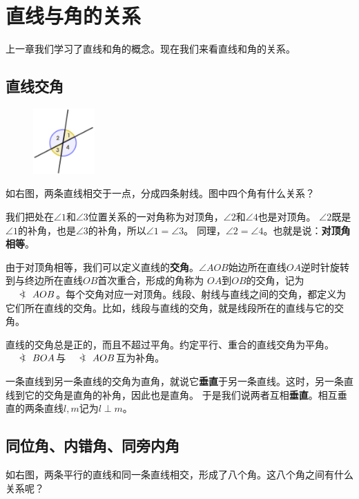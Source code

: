\documentclass[12pt,UTF8]{ctexbook}
\newcommand{\arcangle}{\mathord{\mathpalette\doarcangle\relax}}
\newcommand{\doarcangle}[2]{%
  \hbox{%
    \sbox0{$#1B$}%
    \sbox2{$#1<$}%
    \raisebox{\dimexpr\dp0+(\ht0-\ht2)/2}{%
      $#1<\mspace{-9mu}\mathrel{)}\mspace{2mu}$%
    }%
  }%
}
\begin{document}
\chapter{直线与角的关系}
上一章我们学习了直线和角的概念。现在我们来看直线和角的关系。

\section{直线交角}
\begin{figure} %
    \vspace{-10pt}
    \includegraphics[width=0.21\textwidth]{角度0.png}
\end{figure}

如右图，两条直线相交于一点，分成四条射线。图中四个角有什么关系？

我们把处在$\angle 1$和$\angle 3$位置关系的一对角称为对顶角，$\angle 2$和$\angle 4$也是对顶角。
$\angle 2$既是$\angle 1$的补角，也是$\angle 3$的补角，所以$\angle 1 = \angle 3$。
同理，$\angle 2 = \angle 4$。也就是说：\textbf{对顶角相等}。

由于对顶角相等，我们可以定义直线的\textbf{交角}。$\angle AOB$始边所在直线$OA$逆时针旋转到与终边所在直线$OB$首次重合，形成的角称为
$OA$到$OB$的交角，记为$\arcangle AOB$。每个交角对应一对顶角。线段、射线与直线之间的交角，都定义为它们所在直线的交角。比如，线段与直线的交角，就是线段所在的直线与它的交角。

直线的交角总是正的，而且不超过平角。约定平行、重合的直线交角为平角。$\arcangle BOA$与$\arcangle AOB$互为补角。

一条直线到另一条直线的交角为直角，就说它\textbf{垂直}于另一条直线。这时，另一条直线到它的交角是直角的补角，因此也是直角。
于是我们说两者互相\textbf{垂直}。相互垂直的两条直线$l,m$记为$l\perp m$。


\section{同位角、内错角、同旁内角}
如右图，两条平行的直线和同一条直线相交，形成了八个角。这八个角之间有什么关系呢？
\end{document}
